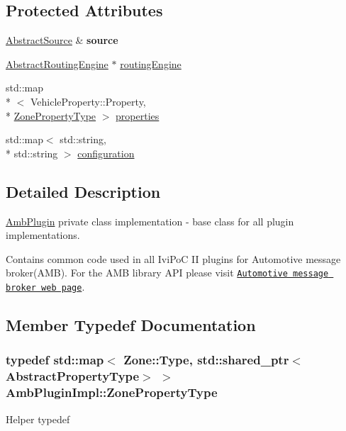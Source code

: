 \subsection*{Protected Attributes}
\begin{DoxyCompactItemize}
\item 
\hypertarget{classAmbPluginImpl_a36fa7b3c793f1410b331d3221079d19b}{\hyperlink{classAbstractSource}{Abstract\+Source} \& {\bfseries source}}\label{classAmbPluginImpl_a36fa7b3c793f1410b331d3221079d19b}

\item 
\hyperlink{classAbstractRoutingEngine}{Abstract\+Routing\+Engine} $\ast$ \hyperlink{classAmbPluginImpl_a44be51306133b0d71ed79507032c3a8c}{routing\+Engine}
\item 
std\+::map\\*
$<$ Vehicle\+Property\+::\+Property, \\*
\hyperlink{classAmbPluginImpl_a6be3e5823bb358932c132760262fb4ee}{Zone\+Property\+Type} $>$ \hyperlink{classAmbPluginImpl_a8f58d50cf0a4dd48b90e8fad6a9f5baa}{properties}
\item 
std\+::map$<$ std\+::string, \\*
std\+::string $>$ \hyperlink{classAmbPluginImpl_a1f711a42020b16453e6890d3634de987}{configuration}
\end{DoxyCompactItemize}


\subsection{Detailed Description}
\hyperlink{classAmbPlugin}{Amb\+Plugin} private class implementation -\/ base class for all plugin implementations. 

Contains common code used in all Ivi\+Po\+C I\+I plugins for Automotive message broker(\+A\+M\+B). For the A\+M\+B library A\+P\+I please visit \href{https://github.com/otcshare/automotive-message-broker}{\tt Automotive message broker web page}. 

\subsection{Member Typedef Documentation}
\hypertarget{classAmbPluginImpl_a6be3e5823bb358932c132760262fb4ee}{
\subsubsection[{Zone\+Property\+Type}]{\setlength{\rightskip}{0pt plus 5cm}typedef std\+::map$<$ Zone\+::\+Type, std\+::shared\+\_\+ptr$<${\bf Abstract\+Property\+Type}$>$ $>$ {\bf Amb\+Plugin\+Impl\+::\+Zone\+Property\+Type}\hspace{0.3cm}{\ttfamily [protected]}}}\label{classAmbPluginImpl_a6be3e5823bb358932c132760262fb4ee}
Helper typedef 

